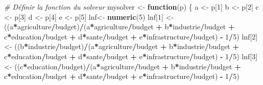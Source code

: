 \documentclass[
]{article}
\newenvironment{Shaded}{\begin{snugshade}}{\end{snugshade}}
\newcommand{\CommentTok}[1]{\textcolor[rgb]{0.56,0.35,0.01}{\textit{#1}}}
\newcommand{\ControlFlowTok}[1]{\textcolor[rgb]{0.13,0.29,0.53}{\textbf{#1}}}
\newcommand{\DecValTok}[1]{\textcolor[rgb]{0.00,0.00,0.81}{#1}}
\newcommand{\FunctionTok}[1]{\textcolor[rgb]{0.13,0.29,0.53}{\textbf{#1}}}
\newcommand{\NormalTok}[1]{#1}
\newcommand{\OtherTok}[1]{\textcolor[rgb]{0.56,0.35,0.01}{#1}}
\newcommand{\SpecialCharTok}[1]{\textcolor[rgb]{0.81,0.36,0.00}{\textbf{#1}}}
\begin{document}
\begin{Shaded}
\begin{Highlighting}[]
  \CommentTok{\# Définir la fonction du solveur}
\NormalTok{  mysolver }\OtherTok{\textless{}{-}} \ControlFlowTok{function}\NormalTok{(p) \{}
\NormalTok{    a }\OtherTok{\textless{}{-}}\NormalTok{ p[}\DecValTok{1}\NormalTok{]}
\NormalTok{    b }\OtherTok{\textless{}{-}}\NormalTok{ p[}\DecValTok{2}\NormalTok{]}
\NormalTok{    c }\OtherTok{\textless{}{-}}\NormalTok{ p[}\DecValTok{3}\NormalTok{]}
\NormalTok{    d }\OtherTok{\textless{}{-}}\NormalTok{ p[}\DecValTok{4}\NormalTok{]}
\NormalTok{    e }\OtherTok{\textless{}{-}}\NormalTok{ p[}\DecValTok{5}\NormalTok{]}
\NormalTok{    lnf}\OtherTok{\textless{}{-}} \FunctionTok{numeric}\NormalTok{(}\DecValTok{5}\NormalTok{)}
\NormalTok{    lnf[}\DecValTok{1}\NormalTok{] }\OtherTok{\textless{}{-}}\NormalTok{ ((a}\SpecialCharTok{*}\NormalTok{agriculture}\SpecialCharTok{/}\NormalTok{budget)}\SpecialCharTok{/}\NormalTok{(a}\SpecialCharTok{*}\NormalTok{agriculture}\SpecialCharTok{/}\NormalTok{budget }\SpecialCharTok{+}\NormalTok{ b}\SpecialCharTok{*}\NormalTok{industrie}\SpecialCharTok{/}\NormalTok{budget }\SpecialCharTok{+}\NormalTok{ c}\SpecialCharTok{*}\NormalTok{education}\SpecialCharTok{/}\NormalTok{budget }\SpecialCharTok{+}\NormalTok{ d}\SpecialCharTok{*}\NormalTok{sante}\SpecialCharTok{/}\NormalTok{budget }\SpecialCharTok{+}\NormalTok{ e}\SpecialCharTok{*}\NormalTok{infrastructure}\SpecialCharTok{/}\NormalTok{budget) }\SpecialCharTok{{-}} \DecValTok{1}\SpecialCharTok{/}\DecValTok{5}\NormalTok{)}
\NormalTok{    lnf[}\DecValTok{2}\NormalTok{] }\OtherTok{\textless{}{-}}\NormalTok{ ((b}\SpecialCharTok{*}\NormalTok{industrie}\SpecialCharTok{/}\NormalTok{budget)}\SpecialCharTok{/}\NormalTok{(a}\SpecialCharTok{*}\NormalTok{agriculture}\SpecialCharTok{/}\NormalTok{budget }\SpecialCharTok{+}\NormalTok{ b}\SpecialCharTok{*}\NormalTok{industrie}\SpecialCharTok{/}\NormalTok{budget }\SpecialCharTok{+}\NormalTok{ c}\SpecialCharTok{*}\NormalTok{education}\SpecialCharTok{/}\NormalTok{budget }\SpecialCharTok{+}\NormalTok{ d}\SpecialCharTok{*}\NormalTok{sante}\SpecialCharTok{/}\NormalTok{budget }\SpecialCharTok{+}\NormalTok{ e}\SpecialCharTok{*}\NormalTok{infrastructure}\SpecialCharTok{/}\NormalTok{budget) }\SpecialCharTok{{-}} \DecValTok{1}\SpecialCharTok{/}\DecValTok{5}\NormalTok{)}
\NormalTok{    lnf[}\DecValTok{3}\NormalTok{] }\OtherTok{\textless{}{-}}\NormalTok{ ((c}\SpecialCharTok{*}\NormalTok{education}\SpecialCharTok{/}\NormalTok{budget)}\SpecialCharTok{/}\NormalTok{(a}\SpecialCharTok{*}\NormalTok{agriculture}\SpecialCharTok{/}\NormalTok{budget }\SpecialCharTok{+}\NormalTok{ b}\SpecialCharTok{*}\NormalTok{industrie}\SpecialCharTok{/}\NormalTok{budget }\SpecialCharTok{+}\NormalTok{ c}\SpecialCharTok{*}\NormalTok{education}\SpecialCharTok{/}\NormalTok{budget }\SpecialCharTok{+}\NormalTok{ d}\SpecialCharTok{*}\NormalTok{sante}\SpecialCharTok{/}\NormalTok{budget }\SpecialCharTok{+}\NormalTok{ e}\SpecialCharTok{*}\NormalTok{infrastructure}\SpecialCharTok{/}\NormalTok{budget) }\SpecialCharTok{{-}} \DecValTok{1}\SpecialCharTok{/}\DecValTok{5}\NormalTok{)}

\end{Highlighting}
\end{Shaded}
\end{document}
